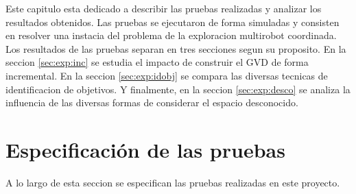 






Este capitulo esta dedicado a describir las pruebas realizadas y analizar los
resultados obtenidos. Las pruebas se ejecutaron de forma simuladas y consisten
en resolver una instacia del problema de la exploracion multirobot coordinada.
Los resultados de las pruebas separan en tres secciones segun su proposito. En
la seccion \ref{sec:exp:inc} se estudia el impacto de construir el GVD de forma
incremental. En la seccion \ref{sec:exp:idobj} se compara las diversas tecnicas
de identificacion de objetivos. Y finalmente, en la seccion \ref{sec:exp:desco}
se analiza la influencia de las diversas formas de considerar el espacio
desconocido. 

\section{Especificación de las pruebas}

A lo largo de esta seccion se especifican las pruebas realizadas en este
proyecto.



